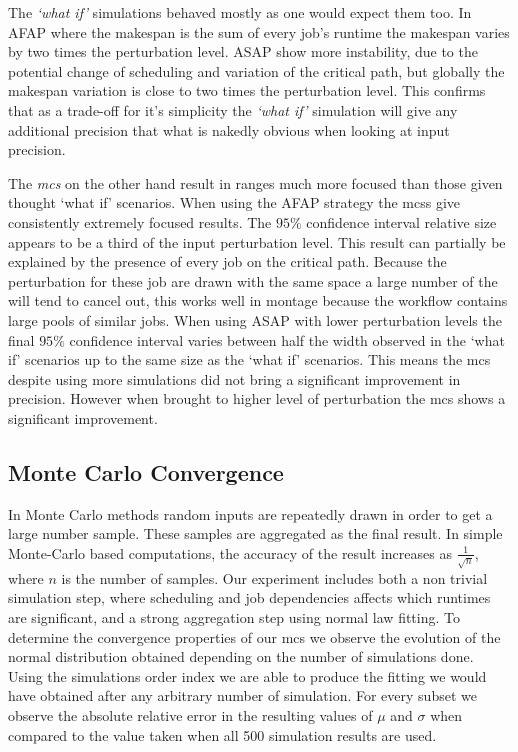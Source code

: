 \documentclass[10pt,conference,compsocconf]{IEEEtran}
\begin{document}
The \emph{`what if'} simulations behaved mostly as one would expect
them too. In AFAP where the makespan is the sum of every job's runtime the
makespan varies by two times the perturbation level. ASAP show more instability,
due to the potential change of scheduling and variation of the critical path,
but globally the makespan variation is close to two times the perturbation
level. This confirms that as a trade-off for it's simplicity the
\emph{`what if'} simulation will give any additional precision that
what is nakedly obvious when looking at input precision. 

The \emph{\acl{mcs}} on the other hand result in ranges much more focused than
those given thought `what if' scenarios. When using the AFAP strategy the
\acp{mcs} give consistently extremely focused results. The $95\%$ confidence interval
relative size appears to be a third of the input perturbation level. This result
can partially be explained by the presence of every job on the critical path.
Because the perturbation for these job are drawn with the same space a large
number of the will tend to cancel out, this works well in montage because the
workflow contains large pools of similar jobs. When using ASAP with lower
perturbation levels the final $95\%$ confidence interval varies between half the
width observed in the `what if' scenarios up to the same size as the `what if'
scenarios. This means the \ac{mcs} despite using more simulations did not bring
a significant improvement in precision. However when brought to higher level of
perturbation the \ac{mcs} shows a significant improvement.




\subsection{Monte Carlo Convergence}

In Monte Carlo methods random inputs are repeatedly drawn in order to get a
large number sample. These samples are aggregated as the final result.
In simple Monte-Carlo based computations, the accuracy of the result increases
as $\frac{1}{\sqrt{n}}$, where $n$ is the number of samples\cite{Press92}.
Our experiment includes both a non trivial simulation step, where
scheduling and job dependencies affects which runtimes are significant, and a
strong aggregation step using normal law fitting. To determine the
convergence properties of our \ac{mcs} we observe the evolution
of the normal distribution obtained depending on the number of simulations done. 
Using the simulations order index we are able to produce the fitting we would
have obtained after any arbitrary number of simulation. For every subset we
observe the absolute relative error in the resulting values of $\mu$ and $\sigma$ 
when compared to the value taken when all 500 simulation results are used. 
\end{document}
